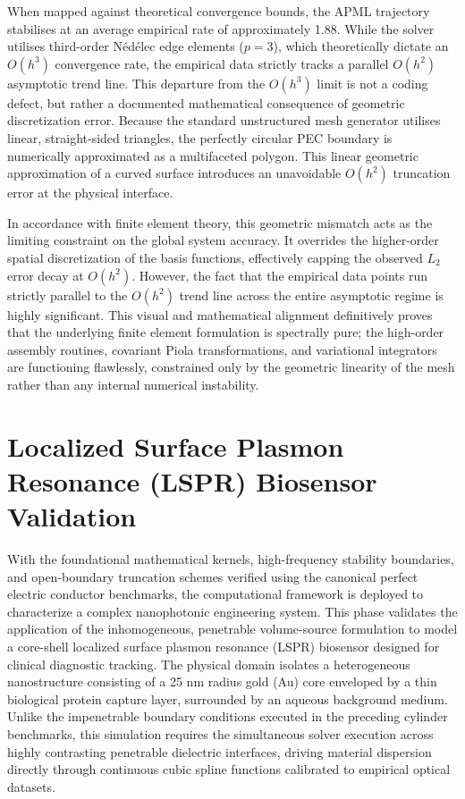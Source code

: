 \documentclass[class=report, crop=false]{standalone}
\begin{document}
\vspace{12pt}

When mapped against theoretical convergence bounds, the APML trajectory stabilises at an average empirical rate of approximately 1.88. While the solver utilises third-order N\'{e}d\'{e}lec edge elements ($p=3$), which theoretically dictate an $O(h^3)$ convergence rate, the empirical data strictly tracks a parallel $O(h^2)$ asymptotic trend line. This departure from the $O(h^3)$ limit is not a coding defect, but rather a documented mathematical consequence of geometric discretization error. Because the standard unstructured mesh generator utilises linear, straight-sided triangles, the perfectly circular PEC boundary is numerically approximated as a multifaceted polygon. This linear geometric approximation of a curved surface introduces an unavoidable $O(h^2)$ truncation error at the physical interface.

\vspace{12pt}

In accordance with finite element theory, this geometric mismatch acts as the limiting constraint on the global system accuracy. It overrides the higher-order spatial discretization of the basis functions, effectively capping the observed $L_2$ error decay at $O(h^2)$. However, the fact that the empirical data points run strictly parallel to the $O(h^2)$ trend line across the entire asymptotic regime is highly significant. This visual and mathematical alignment definitively proves that the underlying finite element formulation is spectrally pure; the high-order assembly routines, covariant Piola transformations, and variational integrators are functioning flawlessly, constrained only by the geometric linearity of the mesh rather than any internal numerical instability.

\section{Localized Surface Plasmon Resonance (LSPR) Biosensor Validation}

With the foundational mathematical kernels, high-frequency stability boundaries, and open-boundary truncation schemes verified using the canonical perfect electric conductor benchmarks, the computational framework is deployed to characterize a complex nanophotonic engineering system. This phase validates the application of the inhomogeneous, penetrable volume-source formulation to model a core-shell localized surface plasmon resonance (LSPR) biosensor designed for clinical diagnostic tracking. The physical domain isolates a heterogeneous nanostructure consisting of a 25 nm radius gold (Au) core enveloped by a thin biological protein capture layer, surrounded by an aqueous background medium. Unlike the impenetrable boundary conditions executed in the preceding cylinder benchmarks, this simulation requires the simultaneous solver execution across highly contrasting penetrable dielectric interfaces, driving material dispersion directly through continuous cubic spline functions calibrated to empirical optical datasets.
\end{document}
